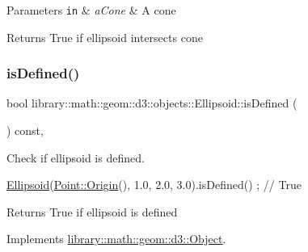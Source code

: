 \begin{DoxyParams}[1]{Parameters}
\mbox{\tt in}  & {\em a\+Cone} & A cone \\
\hline
\end{DoxyParams}
\begin{DoxyReturn}{Returns}
True if ellipsoid intersects cone 
\end{DoxyReturn}
\mbox{\label{classlibrary_1_1math_1_1geom_1_1d3_1_1objects_1_1_ellipsoid_adb42c2c7734c27dcb16d947fc5c9d76d}} 
\subsubsection{\texorpdfstring{is\+Defined()}{isDefined()}}
{\footnotesize\ttfamily bool library\+::math\+::geom\+::d3\+::objects\+::\+Ellipsoid\+::is\+Defined (\begin{DoxyParamCaption}{ }\end{DoxyParamCaption}) const\hspace{0.3cm}{\ttfamily [override]}, {\ttfamily [virtual]}}



Check if ellipsoid is defined. 


\begin{DoxyCode}
\hyperlink{classlibrary_1_1math_1_1geom_1_1d3_1_1objects_1_1_ellipsoid_aae81fe0edc7f0e8d4590ea89ae73cb14}{Ellipsoid}(\hyperlink{classlibrary_1_1math_1_1geom_1_1d3_1_1objects_1_1_point_ab2a38e285c562e50bf350272c083986f}{Point::Origin}(), 1.0, 2.0, 3.0).isDefined() ; \textcolor{comment}{// True}
\end{DoxyCode}


\begin{DoxyReturn}{Returns}
True if ellipsoid is defined 
\end{DoxyReturn}


Implements \hyperlink{classlibrary_1_1math_1_1geom_1_1d3_1_1_object_a2216442e322f0c3ca5f01a4efa22baf7}{library\+::math\+::geom\+::d3\+::\+Object}.

\mbox{\label{classlibrary_1_1math_1_1geom_1_1d3_1_1objects_1_1_ellipsoid_af6e0b91e6de57a4fa4c027442613d91b}} 
